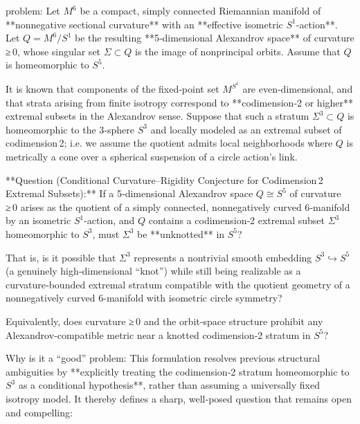 problem:  
Let \( M^6 \) be a compact, simply connected Riemannian manifold of **nonnegative sectional curvature** with an **effective isometric \( S^1 \)-action**.  Let \( Q = M^6 / S^1 \) be the resulting **5‑dimensional Alexandrov space** of curvature ≥ 0, whose singular set \( \Sigma \subset Q \) is the image of nonprincipal orbits.  Assume that \( Q \) is homeomorphic to \( S^5 \).  

It is known that components of the fixed‑point set \( M^{S^1} \) are even‑dimensional, and that strata arising from finite isotropy correspond to **codimension‑2 or higher** extremal subsets in the Alexandrov sense.  Suppose that such a stratum \( \Sigma^{3} \subset Q \) is homeomorphic to the 3‑sphere \( S^3 \) and locally modeled as an extremal subset of codimension 2; i.e. we assume the quotient admits local neighborhoods where \( Q \) is metrically a cone over a spherical suspension of a circle action’s link.  

**Question (Conditional Curvature–Rigidity Conjecture for Codimension 2 Extremal Subsets):**  
If a 5‑dimensional Alexandrov space \( Q \cong S^5 \) of curvature ≥ 0 arises as the quotient of a simply connected, nonnegatively curved 6‑manifold by an isometric \( S^1 \)-action, and \( Q \) contains a codimension‑2 extremal subset \( \Sigma^3 \) homeomorphic to \( S^3 \),  
must \( \Sigma^3 \) be **unknotted** in \( S^5 \)?  

That is, is it possible that \( \Sigma^3 \) represents a nontrivial smooth embedding \( S^3 \hookrightarrow S^5 \) (a genuinely high‑dimensional “knot”) while still being realizable as a curvature‑bounded extremal stratum compatible with the quotient geometry of a nonnegatively curved \( 6 \)-manifold with isometric circle symmetry?  

Equivalently, does curvature ≥ 0 and the orbit‑space structure prohibit any Alexandrov‑compatible metric near a knotted codimension‑2 stratum in \( S^5 \)?  

Why is it a “good” problem:  
This formulation resolves previous structural ambiguities by **explicitly treating the codimension‑2 stratum homeomorphic to \( S^3 \) as a conditional hypothesis**, rather than assuming a universally fixed isotropy model.  It thereby defines a sharp, well‑posed question that remains open and compelling:


